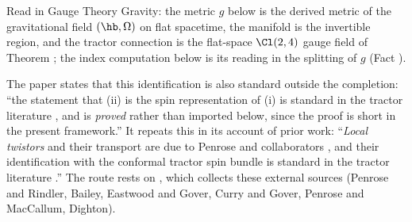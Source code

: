 Read in Gauge Theory Gravity: the metric $g$ below is the derived metric of the gravitational field $(\hb, \Omega)$ on flat spacetime, the manifold is the invertible region, and the tractor connection is the flat-space $\Cl(2,4)$ gauge field of Theorem ; the index computation below is its reading in the splitting of $g$ (Fact ).

The paper states that this identification is also standard outside the completion: ``the statement that (ii) is the spin representation of (i) is standard in the tractor literature \cite{BEG1994, CurryGover2018}, and is \emph{proved} rather than imported below, since the proof is short in the present framework.'' It repeats this in its account of prior work: ``\emph{Local twistors} and their transport are due to Penrose and collaborators \cite{PenroseMacCallum73, Dighton74}, and their identification with the conformal tractor spin bundle is standard in the tractor literature \cite{BEG1994, CurryGover2018}.'' The route rests on , which collects these external sources (Penrose and Rindler, Bailey, Eastwood and Gover, Curry and Gover, Penrose and MacCallum, Dighton).
